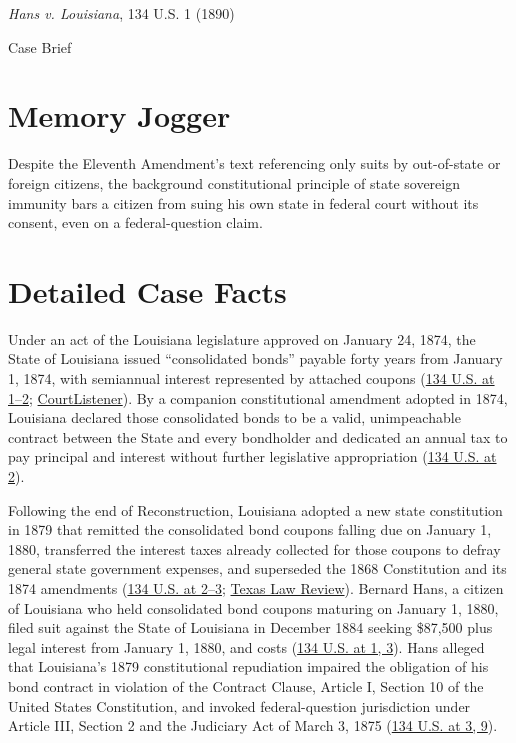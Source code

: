 \documentclass[12pt]{article}
\begin{document}
\begin{center}
{\LARGE \textit{Hans v. Louisiana}, 134 U.S. 1 (1890)\par}
\vspace{0.8em}
{\large Case Brief\par}
\end{center}
\vspace{1em}

\section{Memory Jogger}
Despite the Eleventh Amendment's text referencing only suits by out-of-state or foreign citizens, the background constitutional principle of state sovereign immunity bars a citizen from suing his own state in federal court without its consent, even on a federal-question claim.

\section{Detailed Case Facts}
Under an act of the Louisiana legislature approved on January 24, 1874, the State of Louisiana issued ``consolidated bonds'' payable forty years from January 1, 1874, with semiannual interest represented by attached coupons (\href{https://supreme.justia.com/cases/federal/us/134/1/}{134 U.S. at 1--2}; \href{https://www.courtlistener.com/opinion/92702/hans-v-louisiana/}{CourtListener}). By a companion constitutional amendment adopted in 1874, Louisiana declared those consolidated bonds to be a valid, unimpeachable contract between the State and every bondholder and dedicated an annual tax to pay principal and interest without further legislative appropriation (\href{https://supreme.justia.com/cases/federal/us/134/1/}{134 U.S. at 2}).

Following the end of Reconstruction, Louisiana adopted a new state constitution in 1879 that remitted the consolidated bond coupons falling due on January 1, 1880, transferred the interest taxes already collected for those coupons to defray general state government expenses, and superseded the 1868 Constitution and its 1874 amendments (\href{https://supreme.justia.com/cases/federal/us/134/1/}{134 U.S. at 2--3}; \href{https://texaslawreview.org/state-sovereign-immunity-after-the-revolution/}{Texas Law Review}). Bernard Hans, a citizen of Louisiana who held consolidated bond coupons maturing on January 1, 1880, filed suit against the State of Louisiana in December 1884 seeking \$87,500 plus legal interest from January 1, 1880, and costs (\href{https://supreme.justia.com/cases/federal/us/134/1/}{134 U.S. at 1, 3}). Hans alleged that Louisiana's 1879 constitutional repudiation impaired the obligation of his bond contract in violation of the Contract Clause, Article I, Section 10 of the United States Constitution, and invoked federal-question jurisdiction under Article III, Section 2 and the Judiciary Act of March 3, 1875 (\href{https://supreme.justia.com/cases/federal/us/134/1/}{134 U.S. at 3, 9}).
\end{document}
